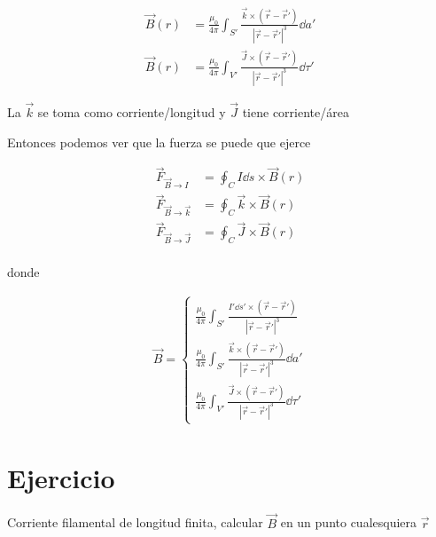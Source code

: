 \documentclass[11pt]{report}
\theoremstyle{plain}
\theoremstyle{definition}
\begin{document}
\begin{align*}
	\vec{B}(r) &= \frac{\mu_0}{4\pi}\int_{S'} \frac{\vec{k}\times\left(\vec{r}-\vec{r}'\right)}{|\vec{r}-\vec{r}'|^3}\dd{a'}\\
	\vec{B}(r) &= \frac{\mu_0}{4\pi}\int_{V'} \frac{\vec{J}\times\left(\vec{r}-\vec{r}'\right)}{|\vec{r}-\vec{r}'|^3}\dd{\tau'}
\end{align*}

La $\vec{k}$ se toma como corriente/longitud y $\vec{J}$ tiene corriente/área


Entonces podemos ver que la fuerza se puede que ejerce 

\begin{align*}
	\vec{F}_{\vec{B}\rightarrow I } &= \oint_C I\dd{s}\times \vec{B}(r) \\
	\vec{F}_{\vec{B}\rightarrow \vec{k} } &= \oint_C \vec{k}\times \vec{B}(r) \\
	\vec{F}_{\vec{B}\rightarrow \vec{J} } &= \oint_C \vec{J}\times \vec{B}(r) \\
\end{align*}

donde

\begin{align*}%
	\vec{B} = 
	\begin{cases}
	\frac{\mu_0}{4\pi}\int_{S'} \frac{I'\dd{s'}\times\left(\vec{r}-\vec{r}'\right)}{|\vec{r}-\vec{r}'|^3}\\
	\frac{\mu_0}{4\pi}\int_{S'} \frac{\vec{k}\times\left(\vec{r}-\vec{r}'\right)}{|\vec{r}-\vec{r}'|^3}\dd{a'}\\
	\frac{\mu_0}{4\pi}\int_{V'} \frac{\vec{J}\times\left(\vec{r}-\vec{r}'\right)}{|\vec{r}-\vec{r}'|^3}\dd{\tau'}
	\end{cases}
\end{align*}



\section*{Ejercicio}

Corriente filamental de longitud finita, calcular $\vec{B}$ en un punto cualesquiera $\vec{r}$
\end{document}
